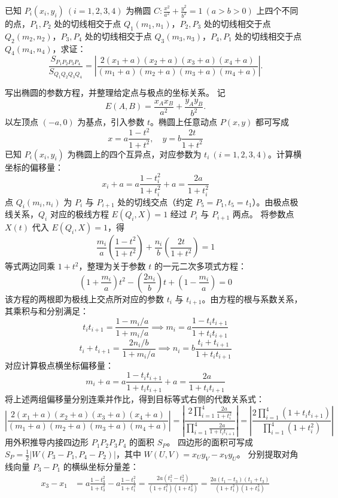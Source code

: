 \begin{example}
已知 \(P_i(x_i,y_i)\ (i=1,2,3,4)\) 为椭圆 \(C: \frac{x^2}{a^2} + \frac{y^2}{b^2} = 1\ (a>b>0)\) 上四个不同的点，\(P_1,P_2\) 处的切线相交于点 \(Q_1(m_1,n_1)\)，\(P_2,P_3\) 处的切线相交于点 \(Q_2(m_2,n_2)\)，\(P_3,P_4\) 处的切线相交于点 \(Q_3(m_3,n_3)\)，\(P_4,P_1\) 处的切线相交于点 \(Q_4(m_4,n_4)\)，求证：
\[
\frac{S_{P_1P_2P_3P_4}}{S_{Q_1Q_2Q_3Q_4}} = \left|
\frac{
2(x_1 + a)(x_2 + a)(x_3 + a)(x_4 + a)
}{
(m_1 + a)(m_2 + a)(m_3 + a)(m_4 + a)
}
\right|.
\]
\end{example}
\begin{solution}
写出椭圆的参数方程，并整理给定点与极点的坐标关系。
记
\[ E(A, B) = \frac{x_A x_B}{a^2} + \frac{y_A y_B}{b^2}. \]
以左顶点 $(-a, 0)$ 为基点，引入参数 $t$。椭圆上任意动点 $P(x, y)$ 都可写成
\[ x = a \frac{1-t^2}{1+t^2}, \quad y = b \frac{2t}{1+t^2} \]
已知 $P_i(x_i, y_i)$ 为椭圆上的四个互异点，对应参数为 $t_i\ (i=1,2,3,4)$。计算横坐标的偏移量：
\[ x_i + a = a \frac{1-t_i^2}{1+t_i^2} + a = \frac{2a}{1+t_i^2} \]
点 $Q_i(m_i, n_i)$ 为 $P_i$ 与 $P_{i+1}$ 处的切线交点（约定 $P_5 = P_1, t_5 = t_1$）。由极点极线关系，$Q_i$ 对应的极线方程 $E(Q_i, X) = 1$ 经过 $P_i$ 与 $P_{i+1}$ 两点。
将参数点 $X(t)$ 代入 $E(Q_i, X) = 1$，得
\[ \frac{m_i}{a} \left(\frac{1-t^2}{1+t^2}\right) + \frac{n_i}{b} \left(\frac{2t}{1+t^2}\right) = 1 \]
等式两边同乘 $1+t^2$，整理为关于参数 $t$ 的一元二次多项式方程：
\[ \left(1 + \frac{m_i}{a}\right)t^2 - \left(\frac{2n_i}{b}\right)t + \left(1 - \frac{m_i}{a}\right) = 0 \]
该方程的两根即为极线上交点所对应的参数 $t_i$ 与 $t_{i+1}$。由方程的根与系数关系，其乘积与和分别满足：
\[ t_i t_{i+1} = \frac{1 - m_i/a}{1 + m_i/a} \implies m_i = a\frac{1 - t_i t_{i+1}}{1 + t_i t_{i+1}} \]
\[ t_i + t_{i+1} = \frac{2n_i/b}{1 + m_i/a} \implies n_i = b\frac{t_i + t_{i+1}}{1 + t_i t_{i+1}} \]
对应计算极点横坐标偏移量：
\[ m_i + a = a\frac{1 - t_i t_{i+1}}{1 + t_i t_{i+1}} + a = \frac{2a}{1 + t_i t_{i+1}} \]
将上述两组偏移量分别连乘并作比，得到目标等式右侧的代数关系式：
\[ \left| \frac{2(x_1 + a)(x_2 + a)(x_3 + a)(x_4 + a)}{(m_1 + a)(m_2 + a)(m_3 + a)(m_4 + a)} \right| = \left| \frac{2 \prod_{i=1}^4 \frac{2a}{1+t_i^2}}{\prod_{i=1}^4 \frac{2a}{1+t_i t_{i+1}}} \right| = \left| \frac{2 \prod_{i=1}^4 (1+t_i t_{i+1})}{\prod_{i=1}^4 (1+t_i^2)} \right| \]
用外积推导内接四边形 $P_1P_2P_3P_4$ 的面积 $S_P$。
四边形的面积可写成 $S_P = \frac{1}{2} |W(P_3-P_1, P_4-P_2)|$，其中 $W(U, V) = x_U y_V - x_V y_U$。
分别提取对角线向量 $P_3-P_1$ 的横纵坐标分量差：
\begin{align*}
x_3 - x_1 &= a\frac{1-t_3^2}{1+t_3^2} - a\frac{1-t_1^2}{1+t_1^2} = \frac{2a(t_1^2 - t_3^2)}{(1+t_1^2)(1+t_3^2)} = \frac{2a(t_1-t_3)(t_1+t_3)}{(1+t_1^2)(1+t_3^2)} \\

\end{align*}
\end{solution}
